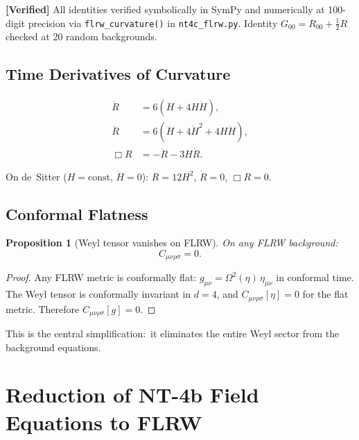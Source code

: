 \documentclass[11pt,a4paper]{article}
\theoremstyle{plain}
\newtheorem{proposition}[theorem]{Proposition}
\theoremstyle{definition}
\newcommand{\verified}[1]{%
  \par\smallskip\noindent
  \colorbox{green!10}{\parbox{\dimexpr\linewidth-2\fboxsep}{%
    \textcolor{green!50!black}{\textbf{[Verified]}} #1}}%
  \par\smallskip}
\begin{document}
\verified{All identities verified symbolically in SymPy and numerically at
100-digit precision via \texttt{flrw\_curvature()} in
\texttt{nt4c\_flrw.py}. Identity $G_{00} = R_{00} + \frac{1}{2}R$
checked at 20 random backgrounds.}

\subsection{Time Derivatives of Curvature}

\begin{align}
  \dot{R} &= 6(\ddot{H} + 4H\dot{H}), \label{eq:Rdot}\\
  \ddot{R} &= 6(\dddot{H} + 4\dot{H}^2 + 4H\ddot{H}), \label{eq:Rddot}\\
  \Box R &= -\ddot{R} - 3H\dot{R}. \label{eq:BoxR}
\end{align}

On de~Sitter ($H = \text{const}$, $\dot{H} = 0$): $R = 12H^2$,
$\dot{R} = 0$, $\Box R = 0$.

\subsection{Conformal Flatness}

\begin{proposition}[Weyl tensor vanishes on FLRW]\label{prop:weyl-flrw}
On any FLRW background:
\begin{equation}\label{eq:weyl-zero}
  C_{\mu\nu\rho\sigma} = 0.
\end{equation}
\end{proposition}

\begin{proof}
Any FLRW metric is conformally flat: $g_{\mu\nu} = \Omega^2(\eta)\,\eta_{\mu\nu}$
in conformal time. The Weyl tensor is conformally invariant in $d = 4$, and
$C_{\mu\nu\rho\sigma}[\eta] = 0$ for the flat metric. Therefore
$C_{\mu\nu\rho\sigma}[g] = 0$.
\end{proof}

This is the central simplification:\ it eliminates the entire Weyl sector
from the background equations.

\section{Reduction of NT-4b Field Equations to FLRW}
\label{sec:reduction}
\end{document}
